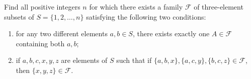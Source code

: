 \documentclass{article}
\begin{document}
\setlength{\parindent}{0pt}
Find all positive integers $n$ for which there exists a family $\mathcal{F}$ of three-element subsets of $S=\{1,2,\dots,n\}$ satisfying the following two conditions:
\begin{enumerate}[label=(\roman*)]
\item for any two different elements $a,b\in S$, there exists exactly one $A\in\mathcal{F}$ containing both $a,b$;
\item if $a,b,c,x,y,z$ are elements of $S$ such that if $\{a,b,x\},\{a,c,y\},\{b,c,z\}\in\mathcal{F}$, then $\{x,y,z\}\in\mathcal{F}$.
\end{enumerate}
\end{document}
